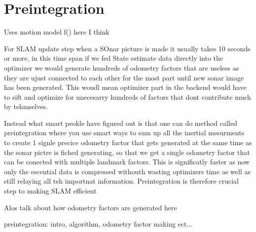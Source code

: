 \section{Preintegration}

Uses motion model f() here I think

For SLAM update step when a SOnar picture is made it usually takes 10 seconds or more, in this time span if we fed State estimate data directly into the optimizer we would generate hundreds of odometry factors that are useless as they are ujust connected to each other for the most part until new sonar image has been generated. This woudl mean optimizer part in the backend would have to sift and optimize for unecesarry hundreds of factors that dont contribute much by tehmselves.

Instead what smart peokle have figured out is that one can do method called preintegration where you use smart ways to sum up all the inertial mesurments to create 1 signle precice odometry factor that gets generated at the same time as the sonar pictre is fiched generating, so that we get a single odometry factor that can be conected with multiple landmark factors. This is significatly faster as now only the escential data is compressed withouth wasting optimizers time as well as still relaying all teh importnat information. Preintegration is therefore crucial step to making SLAM efficient

Alos talk about how odometry factors are generated here

preintegration: intro, algorithm, odometry factor making ect...
